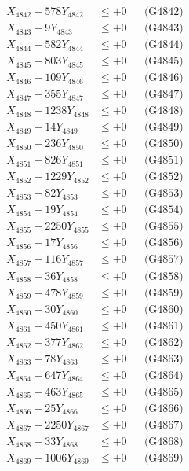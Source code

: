 \documentclass[a4paper,10pt]{article}
\begin{document}
{\begin{align}
X_{4842} - 578Y_{4842} &\leq +0 && \text{(G4842)} \\
X_{4843} - 9Y_{4843} &\leq +0 && \text{(G4843)} \\
X_{4844} - 582Y_{4844} &\leq +0 && \text{(G4844)} \\
X_{4845} - 803Y_{4845} &\leq +0 && \text{(G4845)} \\
X_{4846} - 109Y_{4846} &\leq +0 && \text{(G4846)} \\
X_{4847} - 355Y_{4847} &\leq +0 && \text{(G4847)} \\
X_{4848} - 1238Y_{4848} &\leq +0 && \text{(G4848)} \\
X_{4849} - 14Y_{4849} &\leq +0 && \text{(G4849)} \\
X_{4850} - 236Y_{4850} &\leq +0 && \text{(G4850)} \\
\allowbreak
X_{4851} - 826Y_{4851} &\leq +0 && \text{(G4851)} \\
X_{4852} - 1229Y_{4852} &\leq +0 && \text{(G4852)} \\
X_{4853} - 82Y_{4853} &\leq +0 && \text{(G4853)} \\
X_{4854} - 19Y_{4854} &\leq +0 && \text{(G4854)} \\
X_{4855} - 2250Y_{4855} &\leq +0 && \text{(G4855)} \\
X_{4856} - 17Y_{4856} &\leq +0 && \text{(G4856)} \\
X_{4857} - 116Y_{4857} &\leq +0 && \text{(G4857)} \\
X_{4858} - 36Y_{4858} &\leq +0 && \text{(G4858)} \\
X_{4859} - 478Y_{4859} &\leq +0 && \text{(G4859)} \\
X_{4860} - 30Y_{4860} &\leq +0 && \text{(G4860)} \\
\allowbreak
X_{4861} - 450Y_{4861} &\leq +0 && \text{(G4861)} \\
X_{4862} - 377Y_{4862} &\leq +0 && \text{(G4862)} \\
X_{4863} - 78Y_{4863} &\leq +0 && \text{(G4863)} \\
X_{4864} - 647Y_{4864} &\leq +0 && \text{(G4864)} \\
X_{4865} - 463Y_{4865} &\leq +0 && \text{(G4865)} \\
X_{4866} - 25Y_{4866} &\leq +0 && \text{(G4866)} \\
X_{4867} - 2250Y_{4867} &\leq +0 && \text{(G4867)} \\
X_{4868} - 33Y_{4868} &\leq +0 && \text{(G4868)} \\
X_{4869} - 1006Y_{4869} &\leq +0 && \text{(G4869)} \\

\end{align}}
\end{document}
